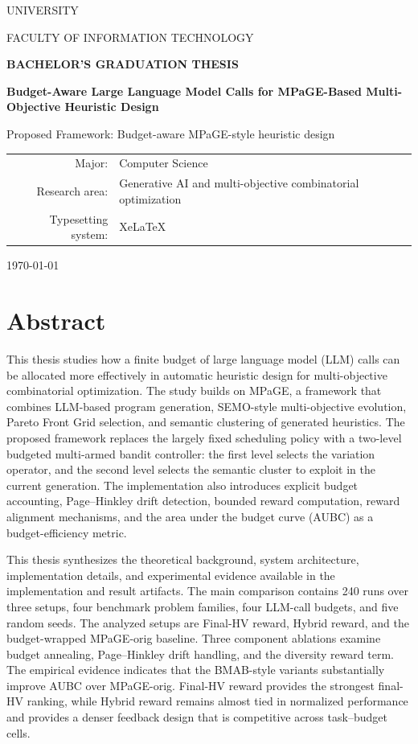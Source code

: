 \documentclass[12pt,a4paper,oneside]{report}
\begin{document}
\hypersetup{pageanchor=false}
\begin{titlepage}
  \centering
  {\Large UNIVERSITY\par}
  \vspace{0.5cm}
  {\large FACULTY OF INFORMATION TECHNOLOGY\par}
  \vspace{2.2cm}
  {\Large\bfseries BACHELOR'S GRADUATION THESIS\par}
  \vspace{1.2cm}
  {\huge\bfseries Budget-Aware Large Language Model Calls for MPaGE-Based Multi-Objective Heuristic Design\par}
  \vspace{1.0cm}
  {\Large Proposed Framework: Budget-aware MPaGE-style heuristic design\par}
  \vfill
  \begin{tabular}{rl}
    Major: & Computer Science \\
    Research area: & Generative AI and multi-objective combinatorial optimization \\
    Typesetting system: & XeLaTeX
  \end{tabular}
  \vfill
  {\large \today\par}
\end{titlepage}

\hypersetup{pageanchor=true}
\chapter*{Abstract}
This thesis studies how a finite budget of large language model (LLM) calls can be allocated more effectively in automatic heuristic design for multi-objective combinatorial optimization. The study builds on MPaGE, a framework that combines LLM-based program generation, SEMO-style multi-objective evolution, Pareto Front Grid selection, and semantic clustering of generated heuristics. The proposed framework replaces the largely fixed scheduling policy with a two-level budgeted multi-armed bandit controller: the first level selects the variation operator, and the second level selects the semantic cluster to exploit in the current generation. The implementation also introduces explicit budget accounting, Page--Hinkley drift detection, bounded reward computation, reward alignment mechanisms, and the area under the budget curve (AUBC) as a budget-efficiency metric.

This thesis synthesizes the theoretical background, system architecture, implementation details, and experimental evidence available in the implementation and result artifacts. The main comparison contains 240 runs over three setups, four benchmark problem families, four LLM-call budgets, and five random seeds. The analyzed setups are Final-HV reward, Hybrid reward, and the budget-wrapped MPaGE-orig baseline. Three component ablations examine budget annealing, Page--Hinkley drift handling, and the diversity reward term. The empirical evidence indicates that the BMAB-style variants substantially improve AUBC over MPaGE-orig. Final-HV reward provides the strongest final-HV ranking, while Hybrid reward remains almost tied in normalized performance and provides a denser feedback design that is competitive across task--budget cells.
\end{document}
